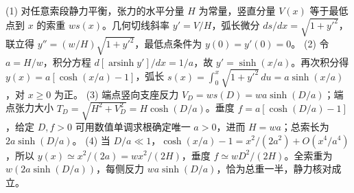 (1) 对任意索段静力平衡，张力的水平分量 \(H\) 为常量，竖直分量 \(V(x)\) 等于最低点到 \(x\) 的索重 \(w s(x)\)。几何切线斜率 \(y'=V/H\)，弧长微分 \(ds/dx=\sqrt{1+y'^2}\)，联立得 \(y''=(w/H)\sqrt{1+y'^2}\)，最低点条件为 \(y(0)=y'(0)=0\)。
(2) 令 \(a=H/w\)，积分方程 \(d[\operatorname{arsinh}y']/dx=1/a\)，故 \(y'=\sinh(x/a)\)。再次积分得 \(y(x)=a[\cosh(x/a)-1]\)，弧长 \(s(x)=\int_0^x\sqrt{1+y'^2}\,du=a\sinh(x/a)\)，对 \(x\ge0\) 为正。
(3) 端点竖向支座反力 \(V_D=ws(D)=wa\sinh(D/a)\)；端点张力大小 \(T_D=\sqrt{H^2+V_D^2}=H\cosh(D/a)\)。垂度 \(f=a[\cosh(D/a)-1]\)，给定 \(D,f>0\) 可用数值单调求根确定唯一 \(a>0\)，进而 \(H=wa\)；总索长为 \(2a\sinh(D/a)\)。
(4) 当 \(D/a\ll1\)，\(\cosh(x/a)-1=x^2/(2a^2)+O(x^4/a^4)\)，所以 \(y(x)\simeq x^2/(2a)=wx^2/(2H)\)，垂度 \(f\simeq wD^2/(2H)\)。全索重为 \(w(2a\sinh(D/a))\)，每侧反力 \(wa\sinh(D/a)\)，恰为总重一半，静力核对成立。
